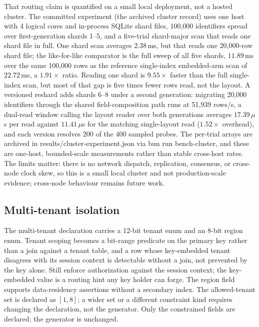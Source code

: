 \documentclass{svproc}
\begin{document}
\label{sec:cluster}
That routing claim is quantified on a small local deployment, not a hosted
cluster. The committed experiment (the archived cluster record)
uses one host with 4 logical cores and in-process SQLite shard files,
100{,}000 identifiers spread over first-generation shards 1--5, and a
five-trial shard-major scan that reads one shard file in full. One shard
scan averages $2.38$\,ms, but that reads one 20{,}000-row shard file; the like-for-like comparator is the full sweep of all five shards, $11.89$\,ms over the same 100{,}000 rows as the reference single-index embedded-arm scan of $22.72$\,ms, a $1.91\times$ ratio. Reading one shard is $9.55\times$ faster than the full single-index scan, but most of that gap is five times fewer rows read, not the layout. A versioned reshard adds
shards 6--8 under a second generation: migrating 20{,}000 identifiers through
the shared field-composition path runs at 51{,}939 rows/s, a dual-read window
calling the layout reader over both generations averages $17.39\,\mu$s per read against $11.41\,\mu$s for
the matching single-layout read ($1.52\times$ overhead), and each version
resolves 200 of the 400 sampled probes. The per-trial arrays are archived in results/cluster-experiment.json via bun run bench-cluster, and these are one-host, bounded-scale measurements rather than stable
cross-host rates. The limits matter: there is no
network dispatch, replication, consensus, or cross-node clock skew, so this
is a small local cluster and not production-scale evidence; cross-node
behaviour remains future work.

\subsection{Multi-tenant isolation}
The multi-tenant declaration carries a 12-bit tenant enum and an 8-bit region enum. Tenant
scoping becomes a bit-range predicate on the primary key rather than
a join against a tenant table, and a row whose key-embedded tenant
disagrees with its session context is detectable without a join, not
prevented by the key alone. Still enforce authorization against the session
context; the key-embedded value is a routing hint any key holder can forge.
The region field supports data-residency assertions without a
secondary index. The allowed-tenant set is declared as $[1,8]$; a
wider set or a different constraint kind requires changing the
declaration, not the generator. Only the constrained fields are declared; the generator is unchanged.
\end{document}
